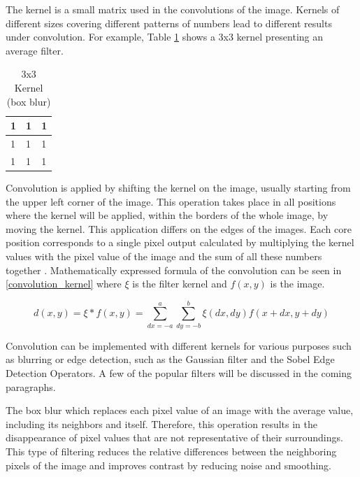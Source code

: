The kernel is a small matrix used in the convolutions of the image. Kernels of different sizes covering different patterns of numbers lead to different results under convolution. For example, Table \ref{tab:Kernal3_3} shows a 3x3 kernel presenting an average filter.

\begin{table}[htbp]
\begin{center}
\caption{3x3 Kernel (box blur)}
\vspace{23pt}
      \begin{tabular}{|l|l|l|}
        \hline
        1 & 1 & 1   \\
        \hline
        1 & 1 & 1   \\
        \hline
        1 & 1 & 1   \\
        \hline
      \end{tabular}
\label{tab:Kernal3_3}
\end{center}
\end{table}

Convolution is applied by shifting the kernel on the image, usually starting from the upper left corner of the image. This operation takes place in all positions where the kernel will be applied, within the borders of the whole image, by moving the kernel. This application differs on the edges of the images. Each core position corresponds to a single pixel output calculated by multiplying the kernel values with the pixel value of the image and the sum of all these numbers together \cite{russ2010image}. Mathematically expressed formula of the convolution can be seen in \ref{convolution_kernel} where  \(\xi\) is the filter kernel and \(f(x,y)\) is the image.

\begin{equation} \label{convolution_kernel}
d(x,y) = \xi * f(x,y) = \sum_{dx=-a}^{a} \sum_{dy=-b}^{b} \xi(dx,dy) f(x + dx, y + dy)
\end{equation}

Convolution can be implemented with different kernels for various purposes such as blurring or edge detection, such as the Gaussian filter and the Sobel Edge Detection Operators. A few of the popular filters will be discussed in the coming paragraphs.

The box blur which replaces each pixel value of an image with the average value, including its neighbors and itself. Therefore, this operation results in the disappearance of pixel values that are not representative of their surroundings. This type of filtering reduces the relative differences between the neighboring pixels of the image and improves contrast by reducing noise and smoothing.

